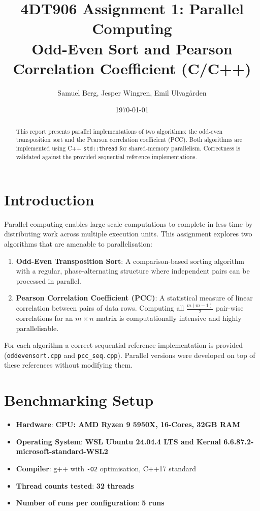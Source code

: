 \documentclass[11pt,a4paper]{article}
\title{4DT906 Assignment 1: Parallel Computing\\
Odd-Even Sort and Pearson Correlation Coefficient (C/C++)}
\author{Samuel Berg, Jesper Wingren, Emil Ulvagården}
\date{\today}
\begin{document}
\maketitle

\begin{abstract}
This report presents parallel implementations of two algorithms: the odd-even transposition sort
and the Pearson correlation coefficient (PCC). Both algorithms are implemented using C++
\texttt{std::thread} for shared-memory parallelism. Correctness is validated against the provided
sequential reference implementations.
\end{abstract}

\tableofcontents
\newpage

\section{Introduction}

Parallel computing enables large-scale computations to complete in less time by distributing work
across multiple execution units. This assignment explores two algorithms that are amenable to
parallelisation:

\begin{enumerate}
    \item \textbf{Odd-Even Transposition Sort}: A comparison-based sorting algorithm with a
          regular, phase-alternating structure where independent pairs can be processed in parallel.
    \item \textbf{Pearson Correlation Coefficient (PCC)}: A statistical measure of linear
          correlation between pairs of data rows. Computing all $\frac{m(m-1)}{2}$ pair-wise
          correlations for an $m \times n$ matrix is computationally intensive and highly
          parallelisable.
\end{enumerate}

For each algorithm a correct sequential reference implementation is provided
(\texttt{oddevensort.cpp} and \texttt{pcc\_seq.cpp}). Parallel versions were developed on top of
these references without modifying them.

\section{Benchmarking Setup}

\begin{itemize}
    \item \textbf{Hardware}: \textbf{CPU: AMD Ryzen 9 5950X, 16-Cores, 32GB RAM}
    \item \textbf{Operating System}: \textbf{WSL Ubuntu 24.04.4 LTS and Kernal 6.6.87.2-microsoft-standard-WSL2}
    \item \textbf{Compiler}: g++ with \texttt{-O2} optimisation, C++17 standard
    \item \textbf{Thread counts tested}: \textbf{32 threads}
    \item \textbf{Number of runs per configuration}: \textbf{5 runs}
\end{itemize}
\end{document}
